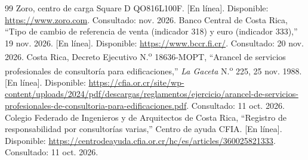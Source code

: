 \begin{thebibliography}{99}
 Zoro, centro de carga Square D QO816L100F. [En línea]. Disponible: \url{https://www.zoro.com}. Consultado: nov. 2026.
 Banco Central de Costa Rica, ``Tipo de cambio de referencia de venta (indicador 318) y euro (indicador 333),'' 19 nov. 2026. [En línea]. Disponible: \url{https://www.bccr.fi.cr/}. Consultado: 20 nov. 2026.
 Costa Rica, Decreto Ejecutivo N.\textsuperscript{o} 18636-MOPT, ``Arancel de servicios profesionales de consultoría para edificaciones,'' \textit{La Gaceta} N.\textsuperscript{o} 225, 25 nov. 1988. [En línea]. Disponible: \url{https://cfia.or.cr/site/wp-content/uploads/2024/pdf/descargas/reglamentos/ejercicio/arancel-de-servicios-profesionales-de-consultoria-para-edificaciones.pdf}. Consultado: 11 oct. 2026.
 Colegio Federado de Ingenieros y de Arquitectos de Costa Rica, ``Registro de responsabilidad por consultorías varias,'' Centro de ayuda CFIA. [En línea]. Disponible: \url{https://centrodeayuda.cfia.or.cr/hc/es/articles/360025821333}. Consultado: 11 oct. 2026.
\end{thebibliography}
